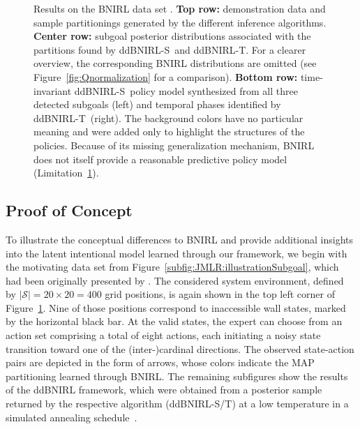 \documentclass[twoside,11pt]{article}
\newcommand{\ddBNIRLS}{\mbox{ddBNIRL-S}}
\newcommand{\ddBNIRLT}{\mbox{ddBNIRL-T}}
\begin{document}
\begin{figure}[p]
	\caption{Results on the BNIRL data set \citep{michini2012bayesian}. \textbf{Top row:} demonstration data and sample partitionings generated by the different inference algorithms. \textbf{Center row:} subgoal posterior distributions associated with the partitions found by \ddBNIRLS\  and \ddBNIRLT. For a clearer overview, the corresponding BNIRL distributions are omitted (see Figure~\ref{fig:Qnormalization} for a comparison). %
		\textbf{Bottom row:} time-invariant \ddBNIRLS\  policy model synthesized from all three detected subgoals (left) and %
		temporal %
		 phases identified by \ddBNIRLT~(right). The background colors have no particular meaning and were added only to highlight the structures of the policies. Because of its missing generalization mechanism, BNIRL does not itself provide a reasonable predictive policy model (Limitation~\hyperref[phantom:lim1]{1}).}
	\label{fig:policySynthesis}
\end{figure}

\subsection{Proof of Concept}
\label{sec:proofConcept}
To illustrate the conceptual differences to BNIRL and provide %
additional insights into the %
latent intentional model learned through our framework, we %
begin with the motivating data set from Figure~\ref{subfig:JMLR:illustrationSubgoal}, which had been originally %
presented %
by \citet{michini2012bayesian}. The considered system environment, defined by $|\mathcal{S}|=20\times20=400$ grid positions, is again shown in the top left corner of 
Figure~\ref{fig:policySynthesis}. Nine of those positions correspond to inaccessible wall states, marked by the horizontal black bar. %
%
At %
 the valid states, the expert can choose from an action set comprising a total of eight actions, each %
initiating
a noisy state transition %
%
toward %
one of the \mbox{(inter-)cardinal} directions. The observed state-action pairs are depicted in the form of arrows, whose colors indicate the MAP partitioning %
learned through BNIRL. %
%
The remaining subfigures show the results of the ddBNIRL framework, which were 
obtained from a posterior sample returned by 
%
the respective algorithm (\mbox{ddBNIRL-S/T}) at a low temperature in a simulated annealing schedule~\citep{kirkpatrick1983optimization}.
%
%
%
%
%
%
\end{document}
